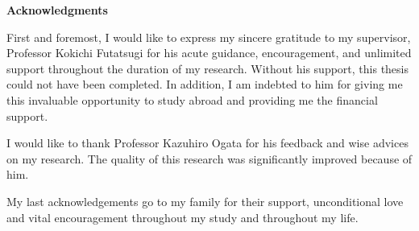 \strut
\vspace{20pt}

\begin{center}
{\LARGE\bf Acknowledgments}
\end{center}

First and foremost, I would like to express my sincere gratitude to my
supervisor, Professor Kokichi Futatsugi for his acute guidance,
encouragement, and unlimited support throughout the duration of my
research. Without his support, this thesis could not have been
completed.  In addition, I am indebted to him for giving me this
invaluable opportunity to study abroad and providing me the financial
support.

I would like to thank Professor Kazuhiro Ogata for his feedback and
wise advices on my research. The quality of this research was
significantly improved because of him.

My last acknowledgements go to my family for their support,
unconditional love and vital encouragement throughout my study and
throughout my life.
\vspace{20pt}


 

